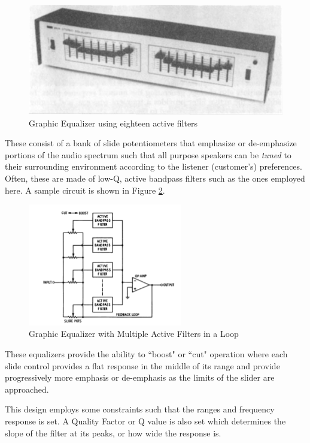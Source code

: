 \documentclass[12pt]{article}
\begin{document}
\begin{figure}[H]
	\centering
	\includegraphics[width=\textwidth]{equalizer}
	\caption{Graphic Equalizer using eighteen active filters}
	\label{fig:equalizer}
\end{figure}
These consist of a bank of slide potentiometers that emphasize or de-emphasize portions of the audio spectrum such that all purpose speakers can be \textit{tuned} to their surrounding environment according to the listener (customer's) preferences. Often, these are made of low-Q, active bandpass filters such as the ones employed here. A sample circuit is shown in Figure \ref{fig:equalizercircuit}.
\begin{figure}[H]
	\centering
	\includegraphics[width=0.6\textwidth]{equalizercircuit}
	\caption{Graphic Equalizer with Multiple Active Filters in a Loop}
	\label{fig:equalizercircuit}
\end{figure}
These equalizers provide the  ability to ``boost" or ``cut" operation where each slide control provides a flat response in the middle of its range and provide progressively more emphasis or de-emphasis as the limits of the slider are approached.

This design employs some constraints such that the ranges and frequency response is set. A Quality Factor or Q value is also set which determines the slope of the filter at its peaks, or how wide the response is.
\end{document}
